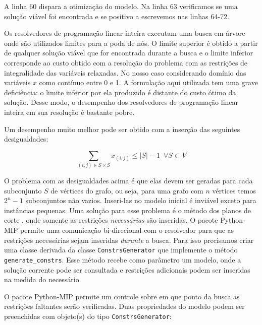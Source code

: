 \documentclass[a4paper,11pt,fleqn]{article}
\begin{document}
A linha 60 dispara a otimização do modelo. Na linha 63 verificamos se uma solução viável foi encontrada e se positivo a escrevemos nas linhas 64-72.

Os resolvedores de programação linear inteira executam uma busca em árvore onde são utilizados limites para a poda de nós. O limite superior é obtido a partir de qualquer solução viável que for encontrada durante a busca e o limite inferior corresponde ao custo obtido com a resolução do problema com as restrições de integralidade das variáveis relaxadas. No nosso caso considerando domínio das variáveis $x$ como contínuo entre 0 e 1. A formulação aqui utilizada tem uma grave deficiência: o limite inferior por ela produzido é distante do custo ótimo da solução. Desse modo, o desempenho dos resolvedores de programação linear inteira em sua resolução é bastante pobre. 

Um desempenho muito melhor pode ser obtido com a inserção das seguintes desigualdades:

\begin{equation}
\sum_{(i,j) \in S \times S} x_{(i,j)} \leq |S|-1 \,\,\, \forall S \subset V 
\end{equation}

O problema com as desigualdades acima é que elas devem ser geradas para cada subconjunto $S$ de vértices do grafo, ou seja, para uma grafo com $n$ vértices temos $2^n-1$ subconjuntos não vazios. Inseri-las no modelo inicial é inviável exceto para instâncias pequenas. Uma solução para esse problema é o método dos planos de corte \citep{Dantzig54}, onde somente as restrições \emph{necessárias} são inseridas. O pacote Python-MIP permite uma comunicação bi-direcional com o resolvedor para que as restrições necessárias sejam inseridas \emph{durante} a busca. Para isso precisamos criar uma classe derivada da classe \texttt{ConstrsGenerator} que implemente o método \texttt{generate\_constrs}. Esse método recebe como parâmetro um modelo, onde a solução corrente pode ser consultada e restrições adicionais podem ser inseridas na medida do necessário. 

O pacote Python-MIP permite um controle sobre em que ponto da busca as restrições faltantes serão verificadas. Duas propriedades do modelo podem ser preenchidas com objeto(s) do tipo \texttt{ConstrsGenerator}:
\end{document}
